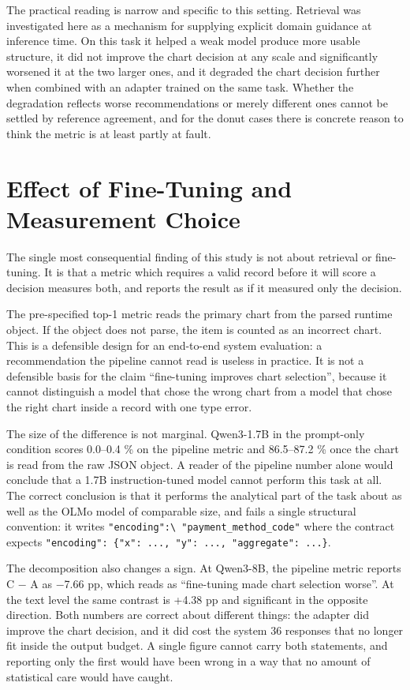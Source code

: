 The practical reading is narrow and specific to this setting. Retrieval was investigated here as a mechanism for supplying explicit domain guidance at inference time. On this task it helped a weak model produce more usable structure, it did not improve the chart decision at any scale and significantly worsened it at the two larger ones, and it degraded the chart decision further when combined with an adapter trained on the same task. Whether the degradation reflects worse recommendations or merely different ones cannot be settled by reference agreement, and for the donut cases there is concrete reason to think the metric is at least partly at fault.

\section{Effect of Fine-Tuning and Measurement Choice}

The single most consequential finding of this study is not about retrieval or fine-tuning. It is that a metric which requires a valid record before it will score a decision measures both, and reports the result as if it measured only the decision.

The pre-specified top-1 metric reads the primary chart from the parsed runtime object. If the object does not parse, the item is counted as an incorrect chart. This is a defensible design for an end-to-end system evaluation: a recommendation the pipeline cannot read is useless in practice. It is not a defensible basis for the claim ``fine-tuning improves chart selection'', because it cannot distinguish a model that chose the wrong chart from a model that chose the right chart inside a record with one type error.

The size of the difference is not marginal. Qwen3-1.7B in the prompt-only condition scores 0.0--0.4 \% on the pipeline metric and 86.5--87.2 \% once the chart is read from the raw JSON object. A reader of the pipeline number alone would conclude that a 1.7B instruction-tuned model cannot perform this task at all. The correct conclusion is that it performs the analytical part of the task about as well as the OLMo model of comparable size, and fails a single structural convention: it writes \nolinkurl{"encoding":\ "payment_method_code"} where the contract expects \texttt{"encoding":\ \{"x":\ ...,\ "y":\ ...,\ "aggregate":\ ...\}}.

The decomposition also changes a sign. At Qwen3-8B, the pipeline metric reports C \ensuremath{-} A as \ensuremath{-}7.66 pp, which reads as ``fine-tuning made chart selection worse''. At the text level the same contrast is +4.38 pp and significant in the opposite direction. Both numbers are correct about different things: the adapter did improve the chart decision, and it did cost the system 36 responses that no longer fit inside the output budget. A single figure cannot carry both statements, and reporting only the first would have been wrong in a way that no amount of statistical care would have caught.

